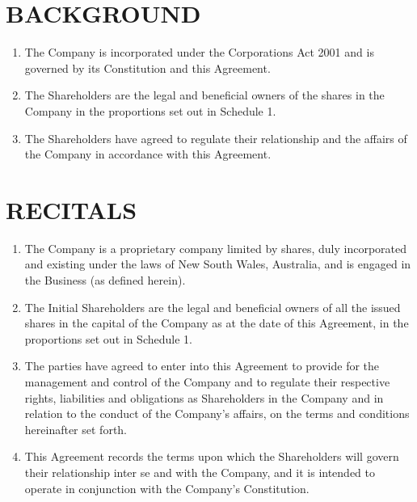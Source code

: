 \section{BACKGROUND}
\begin{enumerate}[label=\Alph*.]
\item The Company is incorporated under the Corporations Act 2001 and is governed by its Constitution and this Agreement.
\item The Shareholders are the legal and beneficial owners of the shares in the Company in the proportions set out in Schedule 1.
\item The Shareholders have agreed to regulate their relationship and the affairs of the Company in accordance with this Agreement.
\end{enumerate}

\section{RECITALS}
\begin{enumerate}[label=\Alph*.]
\item The Company is a proprietary company limited by shares, duly incorporated and existing under the laws of New South Wales, Australia, and is engaged in the Business (as defined herein).
\item The Initial Shareholders are the legal and beneficial owners of all the issued shares in the capital of the Company as at the date of this Agreement, in the proportions set out in Schedule 1.
\item The parties have agreed to enter into this Agreement to provide for the management and control of the Company and to regulate their respective rights, liabilities and obligations as Shareholders in the Company and in relation to the conduct of the Company's affairs, on the terms and conditions hereinafter set forth.
\item This Agreement records the terms upon which the Shareholders will govern their relationship inter se and with the Company, and it is intended to operate in conjunction with the Company's Constitution.
\end{enumerate} 